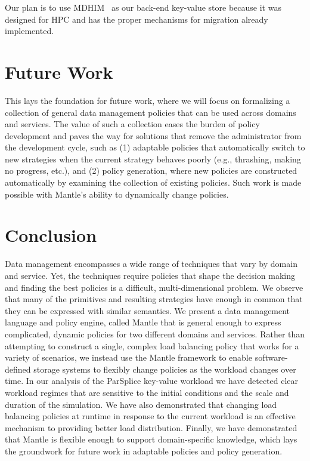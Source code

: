 Our plan is to use MDHIM~\cite{greenberg:hotstorage2015-mdhim} as our back-end
key-value store because it was designed for HPC and has the proper mechanisms
for migration already implemented.  

\section{Future Work}

This lays the foundation for future work, where we will focus on formalizing a
collection of general data management policies that can be used across domains
and services. The value of such a collection eases the burden of policy
development and paves the way for solutions that remove the administrator from
the development cycle, such as (1) adaptable policies that automatically switch
to new strategies when the current strategy behaves poorly ({e.g.}, thrashing,
making no progress, etc.), and (2) policy generation, where new policies are
constructed automatically by examining the collection of existing policies.
Such work is made possible with Mantle's ability to dynamically change
policies.

\section{Conclusion}

Data management encompasses a wide range of techniques that vary by domain and
service. Yet, the techniques require policies that shape the decision making
and finding the best policies is a difficult, multi-dimensional problem. We
observe that many of the primitives and resulting strategies have enough in
common that they can be expressed with similar semantics. We present a data
management language and policy engine, called Mantle that is general enough to
express complicated, dynamic policies for two different domains and services.
Rather than attempting to construct a single, complex load balancing policy
that works for a variety of scenarios, we instead use the Mantle framework to
enable software-defined storage systems to flexibly change policies as the
workload changes over time.  In our analysis of the ParSplice key-value
workload we have detected clear workload regimes that are sensitive to the
initial conditions and the scale and duration of the simulation. We have also
demonstrated that changing load balancing policies at runtime in response to
the current workload is an effective mechanism to providing better load
distribution.  Finally, we have demonstrated that Mantle is flexible enough to
support domain-specific knowledge, which lays the groundwork for future work in
adaptable policies and policy generation.

